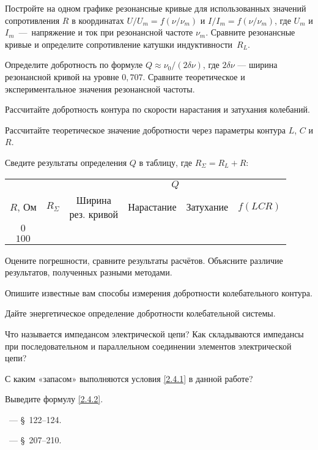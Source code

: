 \begin{lab:task}

	\item Постройте на одном графике резонансные кривые для использованных значений
    сопротивления $R$ в координатах $U/U_m = f(\nu/\nu_m)$
    и $I/I_m = f(\nu/\nu_m)$,
    где $U_m$ и $I_m$~---~напряжение и ток при резонансной частоте $\nu_m$.
    Сравните резонансные кривые и определите сопротивление катушки 
    индуктивности~$R_L$.
    \item Определите добротность по формуле $Q \approx \nu_0/(2\delta\nu)$,
    где $2\delta \nu$ --- ширина резонансной кривой на уровне $0,707$.
    Сравните теоретическое и экспериментальное значения резонансной частоты.

	\item Рассчитайте добротность контура по скорости нарастания и затухания
колебаний.

	\item Рассчитайте теоретическое значение добротности через параметры
контура $L$, $C$ и $R$.

\item Сведите результаты определения $Q$ в таблицу, где $R_{\Sigma}=R_L+R$:\par
{\centering\small
\begin{tabular}{|c|c|c|c|c|c|}
\hline
& & \multicolumn{4}{c|}{$Q$}\\
\cline{3-6}
$R$, Ом & $R_{\Sigma}$ & 
\parbox{2cm}{Ширина\\[-4pt] рез. кривой} & Нарастание & Затухание &$f(LCR)$\\
\hline
$0$ & & & & & \\
$100$ & & & & &\\
\hline
\end{tabular}
}
%
	\item Оцените погрешности, сравните результаты расчётов. Объясните
    различие результатов, полученных разными методами.
\end{lab:task}


\begin{lab:questions}
    \item Опишите известные вам способы измерения добротности колебательного контура.
    \item Дайте энергетическое определение добротности колебательной системы.
    \item Что называется импедансом электрической цепи?
        Как складываются импедансы при последовательном и параллельном
        соединении элементов электрической цепи?
    \item С каким «запасом» выполняются условия \eqref{2.4.1} в данной работе?
    \item Выведите формулу \eqref{2.4.2}.
\end{lab:questions}


\begin{lab:literature}
	\item \SivuhinIII~--- \S~122--124.

	\item \Kalashnikov~--- \S~207--210.
\end{lab:literature}
